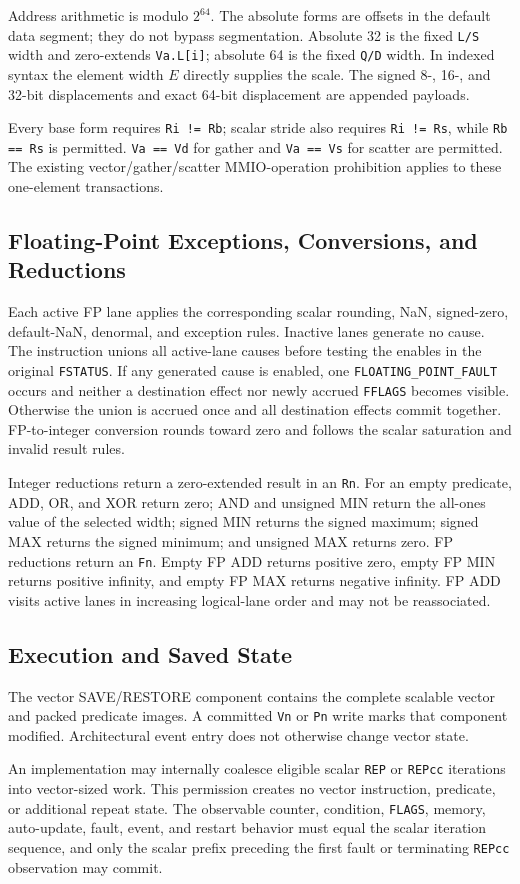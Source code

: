 Address arithmetic is modulo $2^{64}$.  The absolute forms are offsets in the
default data segment; they do not bypass segmentation.  Absolute 32 is the
fixed \texttt{L/S} width and zero-extends \texttt{Va.L[i]}; absolute 64 is the
fixed \texttt{Q/D} width. In indexed syntax the element width $E$ directly
supplies the scale. The signed 8-, 16-, and 32-bit
displacements and exact 64-bit displacement are appended payloads.

Every base form requires \texttt{Ri != Rb}; scalar stride also requires
\texttt{Ri != Rs}, while \texttt{Rb == Rs} is permitted.  \texttt{Va == Vd}
for gather and \texttt{Va == Vs} for scatter are permitted.  The existing
vector/gather/scatter MMIO-operation prohibition applies to these one-element
transactions.

\subsection{Floating-Point Exceptions, Conversions, and Reductions}

Each active FP lane applies the corresponding scalar rounding, NaN,
signed-zero, default-NaN, denormal, and exception rules.  Inactive lanes
generate no cause.  The instruction unions all active-lane causes before
testing the enables in the original \texttt{FSTATUS}.  If any generated cause
is enabled, one \texttt{FLOATING\_POINT\_FAULT} occurs and neither a destination
effect nor newly accrued \texttt{FFLAGS} becomes visible.  Otherwise the union
is accrued once and all destination effects commit together.  FP-to-integer
conversion rounds toward zero and follows the scalar saturation and invalid
result rules.

Integer reductions return a zero-extended result in an \texttt{Rn}.  For an
empty predicate, ADD, OR, and XOR return zero; AND and unsigned MIN return the
all-ones value of the selected width; signed MIN returns the signed maximum;
signed MAX returns the signed minimum; and unsigned MAX returns zero.  FP
reductions return an \texttt{Fn}.  Empty FP ADD returns positive zero, empty FP
MIN returns positive infinity, and empty FP MAX returns negative infinity.
FP ADD visits active lanes in increasing logical-lane order and may not be
reassociated.

\subsection{Execution and Saved State}

The vector SAVE/RESTORE component contains the complete scalable vector and
packed predicate images.  A committed \texttt{Vn} or \texttt{Pn} write marks
that component modified.  Architectural event entry does not otherwise change
vector state.

An implementation may internally coalesce eligible scalar \texttt{REP} or
\texttt{REPcc} iterations into vector-sized work.  This permission creates no
vector instruction, predicate, or additional repeat state.  The observable
counter, condition, \texttt{FLAGS}, memory, auto-update, fault, event, and
restart behavior must equal the scalar iteration sequence, and only the
scalar prefix preceding the first fault or terminating \texttt{REPcc}
observation may commit.

